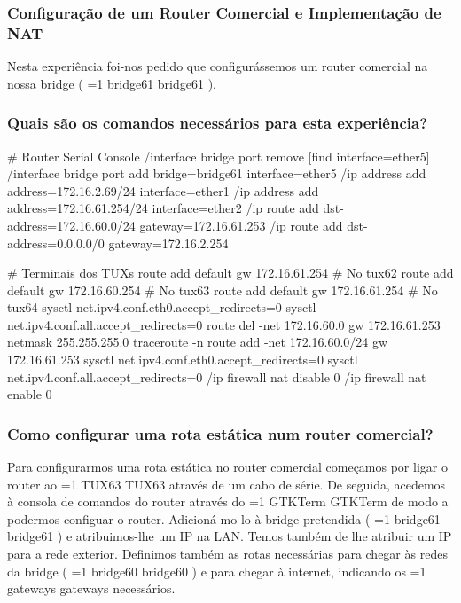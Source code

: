 \documentclass[11pt,a4paper,twocolumn]{article}
\newcommand{\hl}[2][1]{%
  \ifnum#1=1\relax
    \textcolor{text-hl1}{#2}%
  \else
    \textcolor{text-hl2}{#2}%
  \fi
}
\begin{document}
\subsubsection{Configuração de um Router Comercial e Implementação de NAT}

Nesta experiência foi-nos pedido que configurássemos um router comercial na nossa bridge (\hl{bridge61}).

\subsubsection{Quais são os comandos necessários para esta experiência?}

\begin{bash-darktheme}
    # Router Serial Console
    /interface bridge port remove [find interface=ether5]
    /interface bridge port add bridge=bridge61 interface=ether5
    /ip address add address=172.16.2.69/24 interface=ether1
    /ip address add address=172.16.61.254/24 interface=ether2
    /ip route add dst-address=172.16.60.0/24 gateway=172.16.61.253
    /ip route add dst-address=0.0.0.0/0 gateway=172.16.2.254 

    # Terminais dos TUXs
    route add default gw 172.16.61.254 # No tux62
    route add default gw 172.16.60.254 # No tux63
    route add default gw 172.16.61.254 # No tux64    
    sysctl net.ipv4.conf.eth0.accept_redirects=0 
    sysctl net.ipv4.conf.all.accept_redirects=0 
    route del -net 172.16.60.0 gw 172.16.61.253 netmask 255.255.255.0
    traceroute -n
    route add -net 172.16.60.0/24 gw 172.16.61.253
    sysctl net.ipv4.conf.eth0.accept_redirects=0 
    sysctl net.ipv4.conf.all.accept_redirects=0 
    /ip firewall nat disable 0
    /ip firewall nat enable 0
\end{bash-darktheme}

\subsubsection{Como configurar uma rota estática num router comercial?}

Para configurarmos uma rota estática no router comercial começamos por ligar o router ao \hl{TUX63} através de um cabo de série. De seguida, acedemos à consola de comandos do router através do \hl{GTKTerm} de modo a podermos configuar o router. Adicioná-mo-lo à bridge pretendida (\hl[2]{bridge61}) e atribuimos-lhe um IP na LAN. Temos também de lhe atribuir um IP para a rede exterior. Definimos também as rotas necessárias para chegar às redes da bridge (\hl[2]{bridge60}) e para chegar à internet, indicando os \hl{gateways} necessários.
\end{document}
